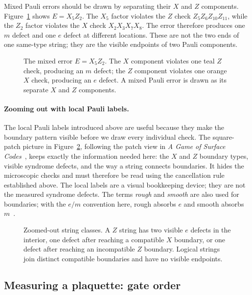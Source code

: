 \documentclass[11pt,a4paper]{article}
\begin{document}
Mixed Pauli errors should be drawn by separating their $X$ and $Z$ components. Figure~\ref{fig:error} shows $E=X_5Z_2$. The $X_5$ factor violates the $Z$ check $Z_5Z_6Z_{10}Z_{11}$, while the $Z_2$ factor violates the $X$ check $X_2X_3X_7X_8$. The error therefore produces one $m$ defect and one $e$ defect at different locations. These are not the two ends of one same-type string; they are the visible endpoints of two Pauli components.

\begin{figure}[!ht]
\centering\errorpatch
\caption{The mixed error $E=X_5Z_2$. The $X$ component violates one teal $Z$ check, producing an $m$ defect; the $Z$ component violates one orange $X$ check, producing an $e$ defect. A mixed Pauli error is drawn as its separate $X$ and $Z$ components.}
\label{fig:error}
\end{figure}

\paragraph{Zooming out with local Pauli labels.}
The local Pauli labels introduced above are useful because they make the boundary pattern visible before we draw every individual check. The square-patch picture in Figure~\ref{fig:abstract}, following the patch view in \emph{A Game of Surface Codes}~\cite{litinski}, keeps exactly the information needed here: the $X$ and $Z$ boundary types, visible syndrome defects, and the way a string connects boundaries. It hides the microscopic checks and must therefore be read using the cancellation rule established above. The local labels are a visual bookkeeping device; they are not the measured syndrome defects. The terms \emph{rough} and \emph{smooth} are also used for boundaries; with the $e/m$ convention here, rough absorbs $e$ and smooth absorbs $m$~\cite{dennis}.

\begin{figure}[!ht]
\centering\abstractstrings
\caption{Zoomed-out string classes. A $Z$ string has two visible $e$ defects in the interior, one defect after reaching a compatible $X$ boundary, or one defect after reaching an incompatible $Z$ boundary. Logical strings join distinct compatible boundaries and have no visible endpoints.}
\label{fig:abstract}
\end{figure}

\FloatBarrier

\subsection{Measuring a plaquette: gate order}
\end{document}
